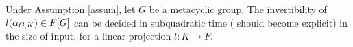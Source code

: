 \begin{proposition}
Under Assumption \ref{assum}, let $G$ be a metacyclic group. The invertibility of $l(\alpha_{G,K}) \in F[G]$ can be decided in 
subquadratic time ({\color{red} should become explicit}) in the size of input, for a linear projection $l: K\rightarrow F$.
\end{proposition}



